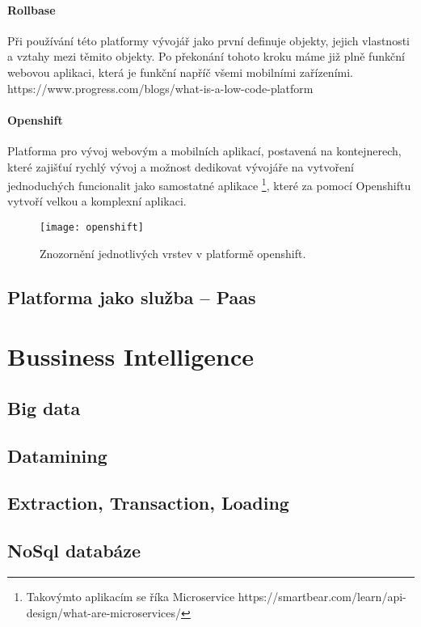 \paragraph{Rollbase} Při používání této platformy vývojář jako první definuje objekty, jejich vlastnosti a vztahy mezi těmito objekty. Po překonání tohoto kroku máme již plně funkční webovou aplikaci, která je funkční napříč všemi mobilními zařízeními. https://www.progress.com/blogs/what-is-a-low-code-platform
\paragraph{Openshift} Platforma pro vývoj webovým a mobilních aplikací, postavená na kontejnerech, které zajišťuí rychlý vývoj a možnost dedikovat vývojáře na vytvoření jednoduchých funcionalit jako samostatné aplikace \footnote{Takovýmto aplikacím se říka Microservice https://smartbear.com/learn/api-design/what-are-microservices/}, které za pomocí Openshiftu vytvoří velkou a komplexní aplikaci.
\begin{figure}[h]
\centering
\texttt{[image: openshift]}
\caption{Znozornění jednotlivých vrstev v platformě openshift.}
\end{figure}

\subsection{Platforma jako služba -- Paas}

\section{Bussiness Intelligence}

\subsection{Big data}

\subsection{Datamining}

\subsection{Extraction, Transaction, Loading}

\subsection{NoSql databáze}
\cite{nosql}

